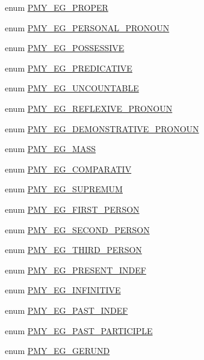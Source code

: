 \begin{DoxyCompactItemize}
enum \hyperlink{gramtab__consts_8php_a9bcc45a865cdad288f0c3b1c5647aa08}{PMY\_\-EG\_\-PROPER} 
\item 
enum \hyperlink{gramtab__consts_8php_a9479b28ba15ed533498b3c961952fe71}{PMY\_\-EG\_\-PERSONAL\_\-PRONOUN} 
\item 
enum \hyperlink{gramtab__consts_8php_aefb385b5b22538b75c6fdf6330c1a287}{PMY\_\-EG\_\-POSSESSIVE} 
\item 
enum \hyperlink{gramtab__consts_8php_a30ad2ebea0f950d62934cbc9c188c9e1}{PMY\_\-EG\_\-PREDICATIVE} 
\item 
enum \hyperlink{gramtab__consts_8php_a622ac3a46f9cd7d1bb32e5089c32b279}{PMY\_\-EG\_\-UNCOUNTABLE} 
\item 
enum \hyperlink{gramtab__consts_8php_a7bc1ab9150ce7070237ae0822461badf}{PMY\_\-EG\_\-REFLEXIVE\_\-PRONOUN} 
\item 
enum \hyperlink{gramtab__consts_8php_a7acc64253305a811cf217cc8b6ea240d}{PMY\_\-EG\_\-DEMONSTRATIVE\_\-PRONOUN} 
\item 
enum \hyperlink{gramtab__consts_8php_a29689626adf3e166bd04e866f2a0cfa1}{PMY\_\-EG\_\-MASS} 
\item 
enum \hyperlink{gramtab__consts_8php_a8dfa8771996f336a66eaeb8cef98bc38}{PMY\_\-EG\_\-COMPARATIV} 
\item 
enum \hyperlink{gramtab__consts_8php_a385c23d4a8a028d7bacc353214aa9d12}{PMY\_\-EG\_\-SUPREMUM} 
\item 
enum \hyperlink{gramtab__consts_8php_a1f490a1b20161cd6f92bfb77dfe03e18}{PMY\_\-EG\_\-FIRST\_\-PERSON} 
\item 
enum \hyperlink{gramtab__consts_8php_a97d783d7f5e354442820348216f30ad9}{PMY\_\-EG\_\-SECOND\_\-PERSON} 
\item 
enum \hyperlink{gramtab__consts_8php_ac2fbde5ba561ccd072581da674ce4819}{PMY\_\-EG\_\-THIRD\_\-PERSON} 
\item 
enum \hyperlink{gramtab__consts_8php_ae61adfcf60c90c27f9b6862de45d68fa}{PMY\_\-EG\_\-PRESENT\_\-INDEF} 
\item 
enum \hyperlink{gramtab__consts_8php_ad306844fcf7a466b076833b3aeec40e4}{PMY\_\-EG\_\-INFINITIVE} 
\item 
enum \hyperlink{gramtab__consts_8php_adb372a665e064e886e613ee4612a7294}{PMY\_\-EG\_\-PAST\_\-INDEF} 
\item 
enum \hyperlink{gramtab__consts_8php_aaa9e39eb5be260327b6968456567c709}{PMY\_\-EG\_\-PAST\_\-PARTICIPLE} 
\item 
enum \hyperlink{gramtab__consts_8php_af6e8ddfa50507597be7bb5f2f7af14e3}{PMY\_\-EG\_\-GERUND} 

\end{DoxyCompactItemize}
